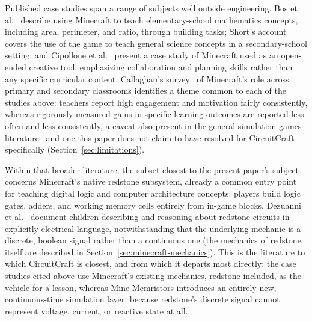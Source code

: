 Published case studies span a range of subjects well outside engineering. Bos et
al.~\cite{bos2014mathematics} describe using Minecraft to teach elementary-school
mathematics concepts, including area, perimeter, and ratio, through building tasks; Short's
account~\cite{short2012teaching} covers the use of the game to teach general science concepts
in a secondary-school setting; and Cipollone et al.~\cite{cipollone2014creative} present a
case study of Minecraft used as an open-ended creative tool, emphasizing collaboration and
planning skills rather than any specific curricular content. Callaghan's
survey~\cite{callaghan2016investigating} of Minecraft's role across primary and secondary
classrooms identifies a theme common to each of the studies above: teachers report high
engagement and motivation fairly consistently, whereas rigorously measured gains in specific
learning outcomes are reported less often and less consistently, a caveat also present in
the general simulation-games literature~\cite{sitzmann2011meta} and one this paper does not
claim to have resolved for CircuitCraft specifically (Section~\ref{sec:limitations}).

Within that broader literature, the subset closest to the present paper's subject concerns
Minecraft's native redstone subsystem, already a common entry point for teaching digital
logic and computer architecture concepts: players build logic gates, adders, and working
memory cells entirely from in-game blocks. Dezuanni et al.~\cite{dezuanni2015redstone}
document children describing and reasoning about redstone circuits in explicitly electrical
language, notwithstanding that the underlying mechanic is a discrete, boolean signal rather
than a continuous one (the mechanics of redstone itself are described in
Section~\ref{sec:minecraft-mechanics}). This is the literature to which CircuitCraft is
closest, and from which it departs most directly: the case studies cited above use
Minecraft's existing mechanics, redstone included, as the vehicle for a lesson, whereas Mine
Memristors introduces an entirely new, continuous-time simulation layer, because redstone's
discrete signal cannot represent voltage, current, or reactive state at all.

